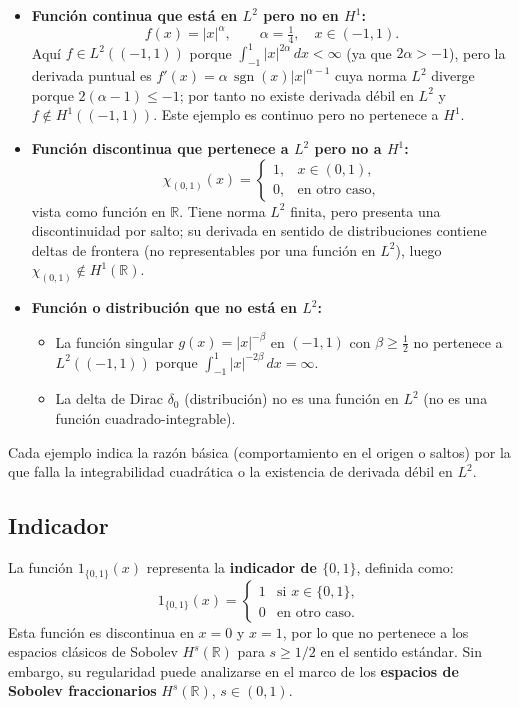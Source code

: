 \documentclass[12pt]{book}
\theoremstyle{definition}
\theoremstyle{plain}
\theoremstyle{remark}
\begin{document}
\begin{itemize}
    \item \textbf{Función continua que está en \(L^{2}\) pero no en \(H^{1}\):} 
    \[
    f(x)=|x|^{\alpha},\qquad \alpha=\tfrac{1}{4},\quad x\in(-1,1).
    \]
    Aquí \(f\in L^{2}((-1,1))\) porque \(\int_{-1}^{1}|x|^{2\alpha}\,dx<\infty\) (ya que \(2\alpha>-1\)), pero la derivada puntual es \(f'(x)=\alpha\,\operatorname{sgn}(x)|x|^{\alpha-1}\) cuya norma \(L^{2}\) diverge porque \(2(\alpha-1)\le -1\); por tanto no existe derivada débil en \(L^{2}\) y \(f\notin H^{1}((-1,1))\). Este ejemplo es continuo pero no pertenece a \(H^{1}\).

    \item \textbf{Función discontinua que pertenece a \(L^{2}\) pero no a \(H^{1}\):}
    \[
    \chi_{(0,1)}(x)=\begin{cases}1,&x\in(0,1),\\0,&\text{en otro caso},\end{cases}
    \]
    vista como función en \(\mathbb{R}\). Tiene norma \(L^{2}\) finita, pero presenta una discontinuidad por salto; su derivada en sentido de distribuciones contiene deltas de frontera (no representables por una función en \(L^{2}\)), luego \(\chi_{(0,1)}\notin H^{1}(\mathbb{R})\).

    \item \textbf{Función o distribución que no está en \(L^{2}\):}
    \begin{itemize}
        \item La función singular \(g(x)=|x|^{-\beta}\) en \((-1,1)\) con \(\beta\geq\tfrac{1}{2}\) no pertenece a \(L^{2}((-1,1))\) porque \(\int_{-1}^{1}|x|^{-2\beta}\,dx=\infty\).
        \item La delta de Dirac \(\delta_{0}\) (distribución) no es una función en \(L^{2}\) (no es una función cuadrado-integrable).
    \end{itemize}
\end{itemize}

Cada ejemplo indica la razón básica (comportamiento en el origen o saltos) por la que falla la integrabilidad cuadrática o la existencia de derivada débil en \(L^{2}\).

\subsection{Indicador}

La función $\mathrm{1}_{\{0,1\}}(x)$ representa la \textbf{indicador de $\{0,1\}$}, definida como:
\[
\mathrm{1}_{\{0,1\}}(x) =
\begin{cases}
1 & \text{si } x \in \{0,1\}, \\
0 & \text{en otro caso}.
\end{cases}
\]
Esta función es discontinua en $x=0$ y $x=1$, por lo que no pertenece a los espacios clásicos de Sobolev $H^s(\mathbb{R})$ para $s \geq 1/2$ en el sentido estándar. Sin embargo, su regularidad puede analizarse en el marco de los \textbf{espacios de Sobolev fraccionarios} $H^s(\mathbb{R})$, $s \in (0,1)$.
\end{document}
